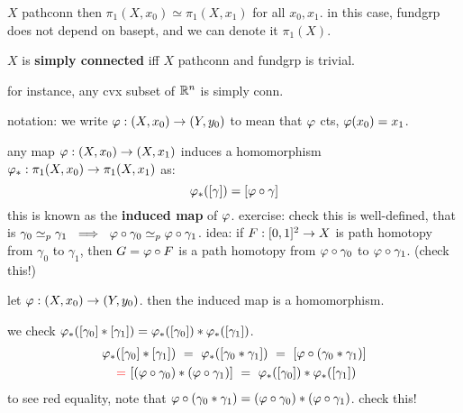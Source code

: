 \begin{crll}
    $X$ pathconn then $\pi_{1}(X,x_{0})\simeq\pi_{1}(X,x_{1})$ for all
    $x_{0},x_{1}$.
    in this case, fundgrp does not depend on basept, and we can denote it
    $\pi_{1}(X)$.
\end{crll}

\begin{defn}
    $X$ is \textbf{simply connected} iff $X$ pathconn and fundgrp is trivial.
\end{defn}
for instance, any cvx subset of $\mathbb{R}^{n}$ is simply conn.

notation: we write $\varphi:(X,x_{0})\rightarrow(Y,y_{0})$ to mean that $\varphi$ cts,
$\varphi(x_{0})=x_{1}$.

any map $\varphi:(X,x_{0})\rightarrow(X,x_{1})$ induces a homomorphism
$\varphi_{*}:\pi_{1}(X,x_{0})\rightarrow\pi_{1}(X,x_{1})$ as:
\begin{equation*}
    \varphi_{*}([\gamma]) = [\varphi\circ\gamma]
\end{equation*}
this is known as the \textbf{induced map} of $\varphi$.
exercise: check this is well-defined, that is
$\gamma_{0}\simeq_{p}\gamma_{1}\ \implies \ \vphi\circ\gamma_{0}\simeq_{p}
\vphi\circ\gamma_{1}$.
idea: if $F:[0,1]^{2}\rightarrow X$ is path homotopy from $\gamma_{0}$ to $\gamma_{1}$,
then $G=\varphi\circ F$ is a path homotopy from $\varphi\circ\gamma_{0}$ to
$\varphi\circ\gamma_{1}$. (check this!)

\begin{prop}
    let $\varphi:(X,x_{0})\rightarrow(Y,y_{0})$.
    then the induced map is a homomorphism.
\end{prop}

\begin{pf}[source=Primary Source Material]
    we check $\varphi_{*}([\gamma_{0}]*[\gamma_{1}]) =
    \varphi_{*}([\gamma_{0}])*\varphi_{*}([\gamma_{1}])$.
    \begin{gather*}
        \vphi_{*}([\gamma_{0}]*[\gamma_{1}])
        \ = \ \vphi_{*}([\gamma_{0}*\gamma_{1}])
        \ = \ [\vphi\circ(\gamma_{0}*\gamma_{1})] \\
        \ \textcolor{red}{=} \ [(\vphi\circ\gamma_{0})*(\vphi\circ\gamma_{1})]
        \ = \ \vphi_{*}([\gamma_{0}])*\vphi_{*}([\gamma_{1}])
    \end{gather*}
    to see red equality, note that $\varphi\circ(\gamma_{0}*\gamma_{1})
    =(\varphi\circ\gamma_{0})*(\varphi\circ\gamma_{1})$. check this!
\end{pf}

